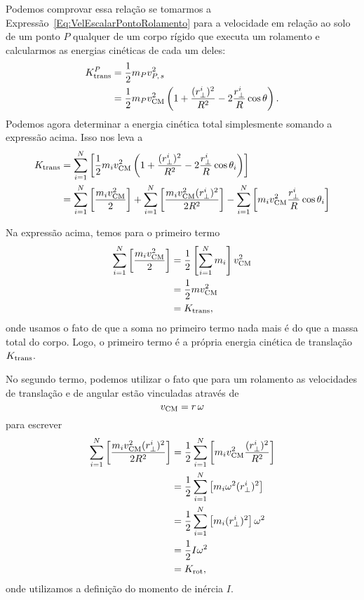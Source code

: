 Podemos comprovar essa relação se tomarmos a Expressão~\ref{Eq:VelEscalarPontoRolamento} para a velocidade em relação ao solo de um ponto $P$ qualquer de um corpo rígido que executa um rolamento e calcularmos as energias cinéticas de cada um deles:
\begin{align}
    K_{\rm{trans}}^P &= \frac{1}{2}m_P v_{P,\,s}^2 \\
    &= \frac{1}{2}m_P v_{\rm{CM}}^2 \left(1 + \frac{(r_\perp^i)^2}{R^2} - 2\frac{r_\perp^i}{R}\cos\theta\right).
\end{align}
%
Podemos agora determinar a energia cinética total simplesmente somando a expressão acima. Isso nos leva a
\begin{align}
    K_{\rm{trans}} &= \sum_{i=1}^N \left[\frac{1}{2}m_i v_{\rm{CM}}^2 \left(1 + \frac{(r_\perp^i)^2}{R^2} - 2\frac{r_\perp^i}{R}\cos\theta_i\right) \right] \\
    &= \sum_{i=1}^N \left[\frac{m_i v_{\rm{CM}}^2}{2}\right] + \sum_{i=1}^N \left[\frac{m_i v_{\rm{CM}}^2 (r_\perp^i)^2}{2R^2} \right] - \sum_{i=1}^N \left[m_i v_{\rm{CM}}^2 \frac{r_\perp^i}{R}\cos\theta_i\right]
\end{align}

Na expressão acima, temos para o primeiro termo
\begin{align}
    \sum_{i=1}^N \left[\frac{m_i v_{\rm{CM}}^2}{2}\right] &= \frac{1}{2} \left[\sum_{i=1}^N m_i \right] v_{\rm{CM}}^2 \\
    &= \frac{1}{2} m v_{\rm{CM}}^2 \\
    &= K_{\rm{trans}},
\end{align}
%
onde usamos o fato de que a soma no primeiro termo nada mais é do que a massa total do corpo. Logo, o primeiro termo é a própria energia cinética de translação $K_{\rm{trans}}$.

No segundo termo, podemos utilizar o fato que para um rolamento as velocidades de translação e de angular estão vinculadas através de
\begin{equation}
    v_{\rm{CM}} = r\,\omega
\end{equation}
%
para escrever
\begin{align}
    \sum_{i=1}^N \left[\frac{m_i v_{\rm{CM}}^2 (r_\perp^i)^2}{2R^2} \right] &= \frac{1}{2} \sum_{i=1}^N \left[m_i v_{\rm{CM}}^2 \frac{(r_\perp^i)^2}{R^2} \right] \\
    &= \frac{1}{2} \sum_{i=1}^N \left[m_i \omega^2 (r_\perp^i)^2 \right] \\
    &= \frac{1}{2} \sum_{i=1}^N \left[m_i (r_\perp^i)^2 \right] \omega^2 \\
    &= \frac{1}{2} I \omega^2 \\
    &= K_{\rm{rot}},
\end{align}
%
onde utilizamos a definição do momento de inércia $I$.

